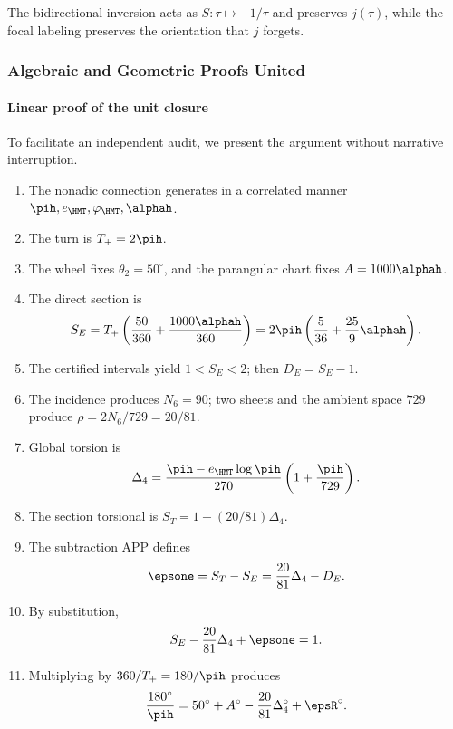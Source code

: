 \begin{theorem}[Modularity]
The bidirectional inversion acts as \(S:\tau\mapsto-1/\tau\) and preserves
\(j(\tau)\), while the focal labeling preserves the orientation that
\(j\) forgets.
\end{theorem}

\subsubsection{Algebraic and Geometric Proofs United}

\paragraph{Linear proof of the unit closure}

To facilitate an independent audit, we present the argument without narrative interruption.

\begin{enumerate}[label=\textbf{Step \arabic*.},leftmargin=2.2cm]
\item The nonadic connection generates in a correlated manner
\(\pih,e_{\HMT},\varphi_{\HMT},\alphah\).
\item The turn is \(T_+=2\pih\).
\item The wheel fixes \(\theta_2=50^\circ\), and the parangular chart fixes
\(A=1000\alphah\).
\item The direct section is
\[
S_E=T_+\left(\frac{50}{360}+\frac{1000\alphah}{360}\right)
=2\pih\left(\frac5{36}+\frac{25}{9}\alphah\right).
\]
\item The certified intervals yield \(1<S_E<2\); then
\(D_E=S_E-1\).
\item The incidence produces \(N_6=90\); two sheets and the ambient space \(729\)
produce \(\rho=2N_6/729=20/81\).
\item Global torsion is
\[
\Delta_4=\frac{\pih-e_{\HMT}\log\pih}{270}
\left(1+\frac{\pih}{729}\right).
\]
\item The section torsional is \(S_T=1+(20/81)\Delta_4\).
\item The subtraction APP defines
\[
\epsone=S_T-S_E=\frac{20}{81}\Delta_4-D_E.
\]
\item By substitution,
\[
S_E-\frac{20}{81}\Delta_4+\epsone=1.
\]
\item Multiplying by \(360/T_+=180/\pih\) produces
\[
\frac{180^\circ}{\pih}
=50^\circ+A^\circ-\frac{20}{81}\Delta_4^\circ+\epsR^\circ.
\]
\end{enumerate}

